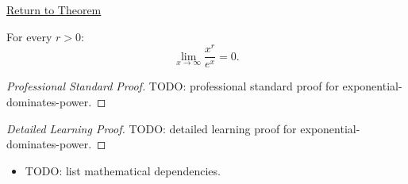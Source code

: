 \newpage
{}
\label{prf:exponential-dominates-power}

\begin{remark*}[Return]
\hyperref[prop:exponential-dominates-power]{Return to Theorem}
\end{remark*}

\begin{theorem*}
For every $r > 0$:
\[
  \lim_{x \to \infty} \frac{x^r}{e^x} = 0.
\]

\smallskip\noindent
\end{theorem*}

\begin{proof}[Professional Standard Proof]
\LRAProofBodyStart
TODO: professional standard proof for exponential-dominates-power.
\end{proof}

\begin{proof}[Detailed Learning Proof]
\LRAProofBodyStart
TODO: detailed learning proof for exponential-dominates-power.
\end{proof}

\begin{remark*}
\end{remark*}

\begin{dependencies}
\begin{itemize}
  \item TODO: list mathematical dependencies.
\end{itemize}
\end{dependencies}

\clearpage
